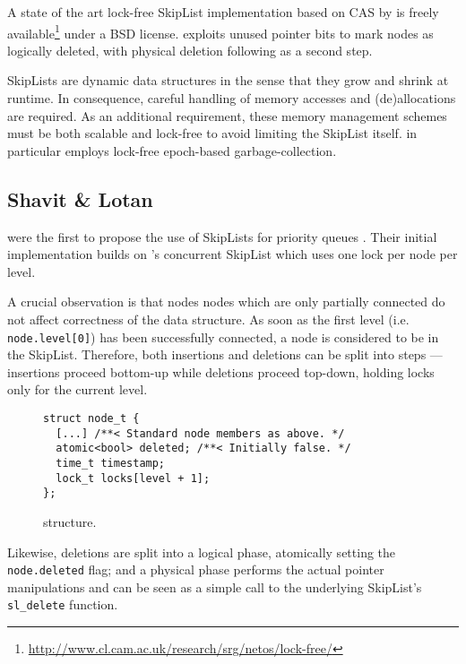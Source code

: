 \documentclass[a4paper,10pt]{article}
\begin{document}
A state of the art lock-free SkipList implementation based on \ac{CAS}
by \citeauthor{fraser2004practical} \cite{fraser2004practical} is freely available\footnote{
\url{http://www.cl.cam.ac.uk/research/srg/netos/lock-free/}} under a BSD license.
\citeauthor{fraser2004practical} exploits unused pointer bits to mark nodes as logically
deleted, with physical deletion following as a second step.

SkipLists are dynamic data structures in the sense that they grow and shrink
at runtime. In consequence, careful handling of memory accesses and (de)allocations
are required. As an additional requirement, these memory management schemes must
be both scalable and lock-free to avoid limiting the SkipList itself.
\citeauthor{fraser2004practical} in particular employs lock-free epoch-based garbage-collection.

\subsection{Shavit \& Lotan} \label{sec:shavit}

\citeauthor{shavit2000skiplist} were the first to propose the use of SkipLists
for priority queues \cite{linden2013skiplist}. Their initial implementation
\cite{shavit2000skiplist} builds on \citeauthor{pugh1998concurrent}'s concurrent
SkipList \cite{pugh1998concurrent} which uses one lock per node per level.


A crucial observation is that nodes nodes which are only partially connected
do not affect correctness of the data structure. As soon as the first level (i.e. \lstinline|node.level[0]|)
has been successfully connected, a node is considered to be in the SkipList.
Therefore, both insertions and deletions can be split into steps --- insertions
proceed bottom-up while deletions proceed top-down, holding locks only for the current level.

\begin{figure}[h]
\begin{lstlisting}
struct node_t {
  [...] /**< Standard node members as above. */
  atomic<bool> deleted; /**< Initially false. */
  time_t timestamp;
  lock_t locks[level + 1];
};
\end{lstlisting}
\caption{\citeauthor{shavit2000skiplist} structure.}
\label{fig:slsl}
\end{figure}

Likewise, deletions are split into a logical phase, atomically setting the \lstinline|node.deleted|
flag; and a physical phase performs the actual pointer manipulations and can be seen as a simple
call to the underlying SkipList's \lstinline|sl_delete| function.
\end{document}
